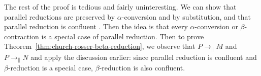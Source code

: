 \documentclass[a4paper, 11pt]{article}
\theoremstyle{plain}
\theoremstyle{definition}
\theoremstyle{remark}
\newcommand\pred{\mathrel{\rightarrow_\parallel}}
\begin{document}
The rest of the proof is tedious and fairly uninteresting. We can show that parallel reductions are preserved by $\alpha$-conversion and by substitution, and that parallel reduction is confluent \parencite[p.~286--289]{hindley-seldin-2008-lambda-calculus-and-combinators}. Then the idea is that every $\alpha$-conversion or $\beta$-contraction is a special case of parallel reduction. Then to prove Theorem~\ref{thm:church-rosser-beta-reduction}, we observe that $P \pred M$ and $P \pred N$ and apply the discussion earlier: since parallel reduction is confluent and $\beta$-reduction is a special case, $\beta$-reduction is also confluent.


\newpage
\printbibliography[]
\end{document}
